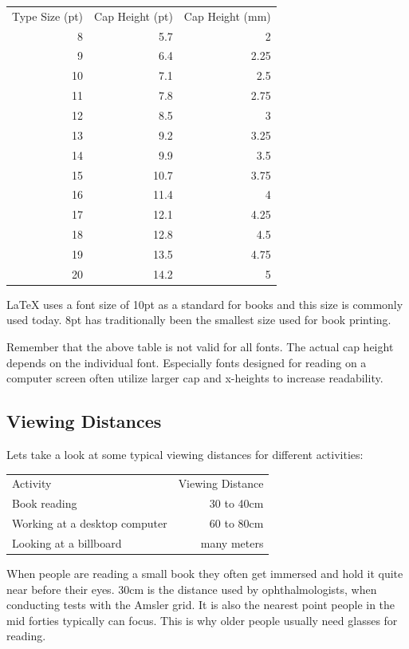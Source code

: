 \vspace{1em}
\begin{tabular}{rrr}
Type Size (pt) & Cap Height (pt) & Cap Height (mm)\\[0.5ex]
8 & 5.7 & 2\\
9 & 6.4 & 2.25\\
10 & 7.1 & 2.5\\
11 & 7.8 & 2.75\\
12 & 8.5 & 3\\
13 & 9.2 & 3.25\\
14 & 9.9 & 3.5\\
15 & 10.7 & 3.75\\
16 & 11.4 & 4\\
17 & 12.1 & 4.25\\
18 & 12.8 & 4.5\\
19 & 13.5 & 4.75\\
20 & 14.2 & 5
\end{tabular}
\vspace{1em}

LaTeX uses a font size of 10pt as a standard for books and this size is
commonly used today. 8pt has traditionally been the smallest size used
for book printing.

Remember that the above table is not valid for all fonts. The actual cap
height depends on the individual font. Especially fonts designed for
reading on a computer screen often utilize larger cap and x-heights to
increase readability.

\subsection{Viewing Distances}

Lets take a look at some typical viewing distances for different
activities:

\vspace{1em}
\begin{tabular}{lr}
Activity & Viewing Distance\\[0.5ex]
Book reading & 30 to 40cm\\
Working at a desktop computer & 60 to 80cm\\
Looking at a billboard & many meters\\
\end{tabular}
\vspace{1em}

When people are reading a small book they often get immersed and hold it
quite near before their eyes. 30cm is the distance used by
ophthalmologists, when conducting tests with the Amsler grid. It is also
the nearest point people in the mid forties typically can focus. This is
why older people usually need glasses for reading.

